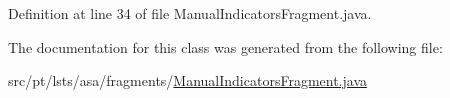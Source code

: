 Definition at line 34 of file Manual\+Indicators\+Fragment.\+java.



The documentation for this class was generated from the following file\+:\begin{DoxyCompactItemize}
\item 
src/pt/lsts/asa/fragments/\hyperlink{ManualIndicatorsFragment_8java}{Manual\+Indicators\+Fragment.\+java}\end{DoxyCompactItemize}
